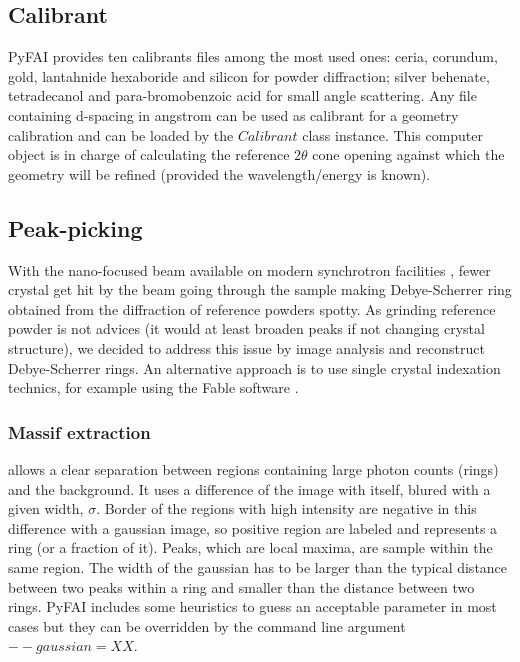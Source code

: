 \documentclass[preprint]{iucr}
\begin{document}
\subsection{Calibrant}
PyFAI provides ten calibrants files among the most used ones: ceria, corundum,
gold, lantahnide hexaboride and silicon for powder diffraction; silver behenate,
tetradecanol and para-bromobenzoic acid for small angle scattering.
Any file containing d-spacing in angstrom can be used as calibrant for a
geometry calibration and can be loaded by the $Calibrant$ class instance.
This computer object is in charge of
calculating the reference $2\theta$ cone opening 
against which the geometry will be refined (provided the wavelength/energy is
known).

\subsection{Peak-picking}
With the nano-focused beam available on modern synchrotron facilities
\cite{id13}, fewer crystal get hit by the beam going through the
sample making Debye-Scherrer ring obtained from the diffraction of reference
powders spotty.
As grinding reference powder is not advices (it would at least broaden peaks if
not changing crystal structure), we decided to address this issue by image analysis 
and reconstruct Debye-Scherrer rings.
An alternative approach is to use single crystal indexation technics, for
example using the Fable software \cite{bonnin}.

\subsubsection{Massif extraction}
\label{massif}
allows a clear separation between regions containing large
photon counts (rings) and the background.
It uses a difference of the image with itself, blured with a given width,
$\sigma$. 
Border of the regions with high intensity are negative in this
difference with a gaussian image, so positive region are labeled and represents
a ring (or a fraction of it). Peaks, which are local maxima, are sample within
the same region.
The width of the gaussian has to be larger than the typical distance
between two peaks within a ring and smaller than the distance between two
rings. 
PyFAI includes some heuristics to guess an acceptable parameter in most cases
but they can be overridden by the command line argument $--gaussian=XX$.
\end{document}
